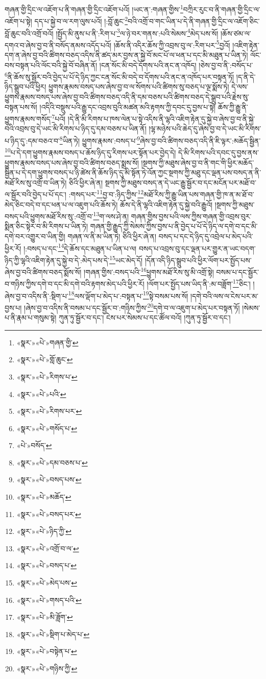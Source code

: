 གཞན་གྱི་དྲིང་ལ་འཇོག་པ་ནི་གཞན་གྱི་དྲིང་འཇོག་པའོ། །ཡང་ན་:གཞན་གྱིས་\footnote{«སྣར་»«པེ་»གཞན་གྱི་}བཀྲིར་རུང་བ་ནི་གཞན་གྱི་དྲིང་ལ་འཇོག་པ་སྟེ། དད་པ་སྐྱེ་བ་ལ་རག་ལུས་པའོ། །:བློ་ཆུང་\footnote{«སྣར་»«པེ་»གློ་ཆུང་}བའི་འགྲོ་བ་གང་ཡིན་པ་དེ་ནི་གཞན་གྱི་དྲིང་ལ་འཇོག་ཅིང་བློ་ཆུང་བའི་འགྲོ་བའོ། །སྤྱོད་མི་ནུས་པ་ནི་:རིག་པ་\footnote{«སྣར་»«པེ་»རིགས་པ་}ལ་ཉེ་བར་གནས་:པའི་སེམས་\footnote{«སྣར་»«པེ་»པའི་}མེད་པས་སོ། །ཆོས་ཙམ་ལ་དགའ་བ་ཞེས་བྱ་བ་ནི་བསོད་ནམས་འདོད་པའོ། །ཆོས་ནི་འདིར་ཆོས་ཀྱི་འབྲས་བུ་ལ་:རིག་པར་\footnote{«སྣར་»«པེ་»རིགས་པར་}བྱའོ། །འཇིག་རྟེན་དག་ན་ཞེས་བྱ་བའི་ཚིགས་བཅད་འདིས་ནི་ཚད་མར་བྱས་ན་སྐྱེ་བོ་མང་པོ་ལ་ཕན་པ་དང་མི་མཐུན་པ་ཡིན་ཏེ། ལོང་བས་བསྟན་པའི་ལོང་བའི་སྐྱེ་བོ་བཞིན་ནོ། །ངན་སོང་མི་བདེ་དོགས་པའི་ནང་ན་འཁོད། །ཅེས་བྱ་བ་ནི་:བསོད་པ་\footnote{«སྣར་»«པེ་»གསོད་པ་}ནི་ཆོས་སུ་སྦྱོར་བའི་བྱེད་པ་པོ་དེ་ཉིད་ཀྱང་ངན་སོང་མི་བདེ་བ་དོགས་པའི་ནང་ན་འཁོད་པར་བསྟན་ཏོ། །ད་ནི་དེ་ཉིད་སྒྲུབ་པའི་ཕྱིར། ཕྱུགས་རྣམས་བསད་པས་ཞེས་བྱ་བ་ལ་སོགས་པའི་ཚིགས་སུ་བཅད་པ་ལྔ་སྨོས་ཏེ། དེ་ལས་ཕྱུགས་རྣམས་བསད་པས་ཞེས་བྱ་བའི་ཚིགས་བཅད་འདི་ནི་དམ་བཅས་པའི་ཚིགས་བཅད་དེ་སྒྲུབ་པའི་རྗེས་སུ་བསྟན་པས་སོ། །འདིའི་བསྡུས་པའི་རྒྱུ་དང་འབྲས་བུའི་མཚན་མའི་རྟགས་ཀྱི་དབང་དུ་བྱས་པ་སྟེ། ཆོས་ཀྱི་རྒྱུ་ནི་ཕྱུགས་རྣམས་གསོད་\footnote{«པེ་»བསོད་}པའོ། །དེ་ནི་མི་རིགས་པ་ཁས་ལེན་པ་སྟེ་འདིས་ནི་ལྷའི་འཇིག་རྟེན་དུ་སྐྱེ་བ་ཞེས་བྱ་བ་ནི་སྐྱེ་བའི་འབྲས་བུ་དེ་ཡང་མི་རིགས་པ་ཉིད་དུ་དམ་བཅས་པ་ཡིན་ནོ། །ལྷ་མཉེས་པའི་ཆེད་དུ་ཞེས་བྱ་བ་དེ་ཡང་མི་རིགས་པ་ཉིད་དུ་:དམ་བཅའ་བ་\footnote{«སྣར་»«པེ་»དམ་བཅས་པ་}ཡིན་ཏེ། ཕྱུགས་རྣམས་:བསད་པ་\footnote{«སྣར་»«པེ་»བསད་པས་}ཞེས་བྱ་བའི་ཚིགས་བཅད་འདི་ནི་ཇི་ལྟར་:མཆོད་སྦྱིན་\footnote{«སྣར་»«པེ་»མཆོད་}པ་དེ་དག་ཕྱུགས་རྣམས་བསད་པ་ཆོས་ཉིད་དུ་རིགས་པར་སྟོན་པར་བྱེད་དེ། དེ་མི་རིགས་པའི་དབང་དུ་བྱས་ནས་ཕྱུགས་རྣམས་བསད་པས་ཞེས་བྱ་བའི་ཚིགས་བཅད་སྨྲས་སོ། །སྔགས་ཀྱི་མཐུས་ཞེས་བྱ་བ་ནི་གང་གི་ཕྱིར་མཆོད་སྦྱིན་པ་དེ་དག་ཕྱུགས་བསད་པ་ཉི་ཚེས་ནི་ཆོས་ཉིད་དུ་མི་སྟོན་ཏེ་འོན་ཀྱང་སྔགས་ཀྱི་མཐུ་དང་ལྡན་པས་བསད་ན་ནི་མཐོ་རིས་སུ་འགྲོ་བ་ཡིན་ཏེ། ཅིའི་ཕྱིར་ཞེ་ན། སྔགས་ཀྱི་མཐུས་བསད་ན་དེ་ཡང་རྒྱུ་སྦྱོར་བ་དང་མངོན་པར་མཐོ་བ་ལ་སྦྱོར་བའི་བྱེད་པ་པོ་དང་། :གསད་པར་\footnote{«སྣར་»«པེ་»བསད་པར་}བྱ་བ་:ཉིད་ཀྱིས་\footnote{«སྣར་»«པེ་»ཉིད་ཀྱི་}མཐོ་རིས་ཀྱི་རྒྱུ་ཡིན་པས་གཞན་གྱི་ཁ་ན་མ་ཐོ་བ་མེད་ཅིང་བདེ་བ་དང་ཕན་པ་ལ་འཇུག་པའི་ཆོས་ཏེ། ཆོས་དེ་ནི་ལྷའི་འཇིག་རྟེན་དུ་སྐྱེ་བའི་རྒྱུའོ། །སྔགས་ཀྱི་མཐུས་བསད་པའི་ཕྱུགས་མཐོ་རིས་སུ་:འགྲོ་བ་\footnote{«སྣར་»«པེ་»འགྲོ་བ་ལ་}ག་ལས་ཤེ་ན། གཞན་གྱིས་བྱས་པའི་ལས་ཀྱིས་གཞན་གྱི་འབྲས་བུར་སྨིན་ཅིང་སྟེར་བ་མི་རིགས་པ་ཡིན་ཏེ། གཞན་གྱི་རྒྱུད་ཀྱི་སེམས་ཀྱིས་བྱས་པ་ནི་བྱེད་པ་པོ་དེ་ཉིད་ལ་དགེ་བ་དང་མི་དགེ་བར་འགྱུར་བ་ཡིན་གྱི། གཞན་ལ་ནི་མ་ཡིན་ཏེ། ཅིའི་ཕྱིར་ཞེ་ན། བསད་པ་དང་དེ་ཉིད་དུ་འབྲེལ་པ་མེད་པའི་ཕྱིར་རོ། །:བསད་པ་དང་\footnote{«སྣར་»«པེ་»བསད་པ་}དེ་ཆོས་དང་མཐུན་པ་ཡིན་པ་ལ། བསད་པ་འབྲས་བུ་དང་ལྡན་པར་གྱུར་ན་ཡང་བདག་ཉིད་ཀྱི་ལྷའི་འཇིག་རྟེན་དུ་སྐྱེ་བ་དེ་:མེད་པས་དེ་\footnote{«སྣར་»«པེ་»མེད་པས་}ཡང་མེད་དོ། །དོན་འདི་ཉིད་སྒྲུབ་པའི་ཕྱིར་ལོག་པར་སྤྱོད་པས་ཞེས་བྱ་བའི་ཚིགས་བཅད་སྨོས་སོ། །གཞན་གྱིས་:བསད་པའི་\footnote{«སྣར་»«པེ་»གསད་པའི་}ཕྱུགས་མཐོ་རིས་སུ་མི་འགྲོ་སྟེ། བསམ་པ་དང་སྦྱོར་བ་གཉིས་ཀྱིས་དགེ་བ་དང་མི་དགེ་བའི་རྟགས་མེད་པའི་ཕྱིར་རོ། །ལོག་པར་སྤྱོད་པས་ཡིད་ནི་:མ་བཟློག་\footnote{«སྣར་»«པེ་»མི་ཟློག་}ཅིང་། །ཞེས་བྱ་བ་འདིས་ནི་:སྡིག་པ་\footnote{«སྣར་»«པེ་»སྡིག་པ་མེད་པ་}ལས་ལྡོག་པ་མེད་པ་:བསྟན་པ་\footnote{«སྣར་»«པེ་»བསྟེན་པ་}སྟེ་བསམ་པས་སོ། །དགེ་བའི་ལས་ལ་ངེས་པར་མ་བྱས་པ། །ཞེས་བྱ་བ་འདིས་ནི་བསམ་པ་དང་སྦྱོར་བ་:གཉིས་ཀྱིས་\footnote{«སྣར་»«པེ་»གཉིས་ཀྱི་}དགེ་བ་ལ་འཇུག་པ་མེད་པར་བསྟན་ཏོ། །སེམས་པ་ནི་རྣམ་པ་གསུམ་སྟེ། ཀུན་ཏུ་སྦྱོར་བ་དང་། ངེས་པར་སེམས་པ་དང་ཚོལ་བའོ། །ཀུན་ཏུ་སྦྱོར་བ་དང་། 